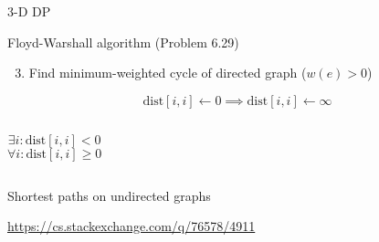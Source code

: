 \begin{frame}{3-D DP}
  \begin{exampleblock}{Floyd-Warshall algorithm (Problem 6.29)}
	\begin{enumerate}[(1)]
	  \setcounter{enumi}{2}
	  \item Find minimum-weighted cycle of directed graph ($w(e) > 0$)
	\end{enumerate}
  \end{exampleblock}

  \[
	\text{dist}[i,i] \gets 0 \implies \text{dist}[i,i] \gets \infty 
  \]

  \pause
  \begin{columns}
	  \[
		\exists i: \text{dist}[i,i] < 0
	  \]
	  \[
		\forall i: \text{dist}[i,i] \ge 0
	  \]
  \end{columns}
\end{frame}
\begin{frame}{Shortest paths on undirected graphs}

  \centerline{\url{https://cs.stackexchange.com/q/76578/4911}}
\end{frame}
